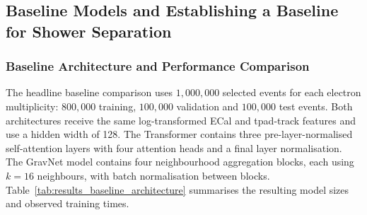 

\subsection{Baseline Models and Establishing a Baseline for Shower Separation}

\subsubsection{Baseline Architecture and Performance Comparison}

The headline baseline comparison uses \(1{,}000{,}000\) selected events for
each electron multiplicity: \(800{,}000\) training, \(100{,}000\) validation
and \(100{,}000\) test events.
Both architectures receive the same log-transformed ECal and \gls{tpad}-track
features and use a hidden width of 128. The Transformer contains three
pre-layer-normalised self-attention layers with four attention heads and a
final layer normalisation. The GravNet model contains four neighbourhood
aggregation blocks, each using \(k=16\) neighbours, with batch normalisation
between blocks. Table~\ref{tab:results_baseline_architecture} summarises the
resulting model sizes and observed training times.




